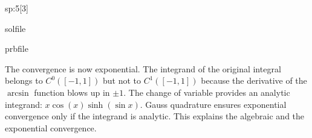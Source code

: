 \begin{samproblem}
\begin{subproblem}{sp:5}[3]
  \begin{samwriteprbpart}{solfile}
    \begin{writeverbatim}{prbfile}
      \begin{samsolution}
        The convergence is now exponential.
        The integrand of the original integral belongs to $C^0([-1,1])$ but not to $C^1([-1,1])$ 
        because the derivative of the $\arcsin$ function blows up in $\pm1$.
        The change of variable provides an analytic integrand: $x\cos(x)\sinh(\sin x)$.
        Gauss quadrature ensures exponential convergence only if the integrand is analytic.
        This explains the algebraic and the exponential convergence.
      \end{samsolution}
    \end{writeverbatim}
  \end{samwriteprbpart}

\end{subproblem}
\end{samproblem}
